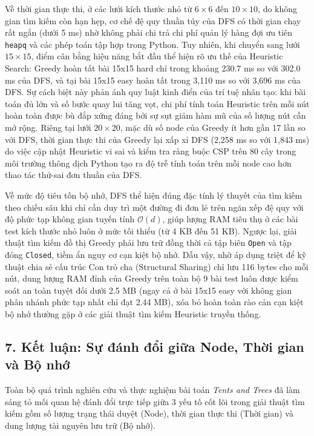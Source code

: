 \documentclass[a4paper,12pt]{article}
\begin{document}
Về thời gian thực thi, ở các lưới kích thước nhỏ từ $6\times 6$ đến $10\times 10$, do không gian tìm kiếm còn hạn hẹp, cơ chế đệ quy thuần túy của DFS có thời gian chạy rất ngắn (dưới 5 ms) nhờ không phải chi trả chi phí quản lý hàng đợi ưu tiên \texttt{heapq} và các phép toán tập hợp trong Python. Tuy nhiên, khi chuyển sang lưới $15\times 15$, điểm cân bằng hiệu năng bắt đầu thể hiện rõ ưu thế của Heuristic Search: Greedy hoàn tất bài 15x15 hard chỉ trong khoảng 230.7 ms so với 302.0 ms của DFS, và tại bài 15x15 easy hoàn tất trong 3,110 ms so với 3,696 ms của DFS. Sự cách biệt này phản ánh quy luật kinh điển của trí tuệ nhân tạo: khi bài toán đủ lớn và số bước quay lui tăng vọt, chi phí tính toán Heuristic trên mỗi nút hoàn toàn được bù đắp xứng đáng bởi sự sụt giảm hàm mũ của số lượng nút cần mở rộng. Riêng tại lưới $20\times 20$, mặc dù số node của Greedy ít hơn gần 17 lần so với DFS, thời gian thực thi của Greedy lại xấp xỉ DFS (2,258 ms so với 1,843 ms) do việc cập nhật Heuristic vi sai và kiểm tra ràng buộc CSP trên 80 cây trong môi trường thông dịch Python tạo ra độ trễ tính toán trên mỗi node cao hơn thao tác thử-sai đơn thuần của DFS.

Về mức độ tiêu tốn bộ nhớ, DFS thể hiện đúng đặc tính lý thuyết của tìm kiếm theo chiều sâu khi chỉ cần duy trì một đường đi đơn lẻ trên ngăn xếp đệ quy với độ phức tạp không gian tuyến tính $\mathcal{O}(d)$, giúp lượng RAM tiêu thụ ở các bài test kích thước nhỏ luôn ở mức tối thiểu (từ 4 KB đến 51 KB). Ngược lại, giải thuật tìm kiếm đồ thị Greedy phải lưu trữ đồng thời cả tập biên \texttt{Open} và tập đóng \texttt{Closed}, tiềm ẩn nguy cơ cạn kiệt bộ nhớ. Dẫu vậy, nhờ áp dụng triệt để kỹ thuật chia sẻ cấu trúc Con trỏ cha (Structural Sharing) chỉ lưu 116 bytes cho mỗi nút, dung lượng RAM đỉnh của Greedy trên toàn bộ 9 bài test luôn được kiểm soát an toàn tuyệt đối dưới 2.5 MB (ngay cả ở bài 15x15 easy với không gian phân nhánh phức tạp nhất chỉ đạt 2.44 MB), xóa bỏ hoàn toàn rào cản cạn kiệt bộ nhớ thường gặp ở các giải thuật tìm kiếm Heuristic truyền thống.

\subsection*{7. Kết luận: Sự đánh đổi giữa Node, Thời gian và Bộ nhớ}

Toàn bộ quá trình nghiên cứu và thực nghiệm bài toán \textit{Tents and Trees} đã làm sáng tỏ mối quan hệ đánh đổi trực tiếp giữa 3 yếu tố cốt lõi trong giải thuật tìm kiếm gồm số lượng trạng thái duyệt (Node), thời gian thực thi (Thời gian) và dung lượng tài nguyên lưu trữ (Bộ nhớ).
\end{document}
